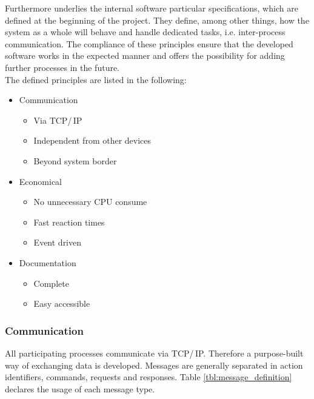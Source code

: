 Furthermore underlies the internal software particular specifications, which are defined at the beginning of the project. They define, among other things, how the system as a whole will behave and handle dedicated tasks, i.e. inter-process communication. The compliance of these principles ensure that the developed software works in the expected manner and offers the possibility for adding further processes in the future.\\

The defined principles are listed in the following:

\begin{itemize}
\itemsep0em
\item Communication
	\begin{itemize}
	\item Via TCP/\,IP
	\item Independent from other devices
	\item Beyond system border
	\end{itemize}
	
\item Economical
	\begin{itemize}
	\item No unnecessary CPU consume
	\item Fast reaction times
	\item Event driven
	\end{itemize}
	
\item Documentation
	\begin{itemize}
	\item Complete
	\item Easy accessible
	\end{itemize}
\end{itemize}

\subsubsection{Communication}

All participating processes communicate via TCP/\,IP. Therefore a purpose-built way of exchanging data is developed. Messages are generally separated in action identifiers, commands, requests and responses. Table \ref{tbl:message_definition} declares the usage of each message type.\\ 

